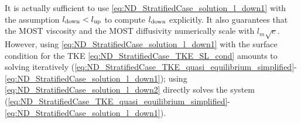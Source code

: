 It is actually sufficient to use
\eqref{eq:ND_StratifiedCase_solution_l_down1} with
the assumption $l_{\rm down} < l_{\rm up}$
to compute $l_{\rm down}$ explicitly. It also guarantees that
the MOST viscosity and the MOST diffusivity numerically
scale with $l_m\sqrt{e}$.
However, using \eqref{eq:ND_StratifiedCase_solution_l_down1}
with the surface condition for the TKE
\eqref{eq:ND_StratifiedCase_TKE_SL_cond}
amounts to solving iteratively
(\ref{eq:ND_StratifiedCase_TKE_quasi_equilibrium_simplified}-
\ref{eq:ND_StratifiedCase_solution_l_down1});
using \eqref{eq:ND_StratifiedCase_solution_l_down2}
directly solves the system
(\ref{eq:ND_StratifiedCase_TKE_quasi_equilibrium_simplified}-
\ref{eq:ND_StratifiedCase_solution_l_down1}).
